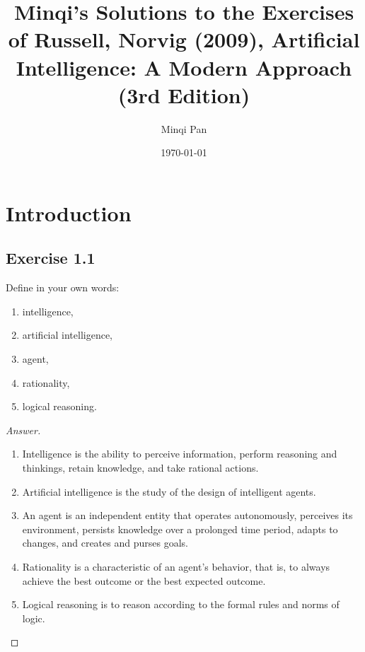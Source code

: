 \documentclass{amsbook}
\theoremstyle{definition}
\theoremstyle{remark}
\numberwithin{section}{chapter}
\numberwithin{equation}{chapter}
\begin{document}
\frontmatter

\title{Minqi's Solutions to the Exercises of Russell, Norvig (2009), Artificial Intelligence: A Modern Approach (3rd Edition)}

\author{Minqi Pan}

\date{\today}

\maketitle

\setcounter{page}{4}

\tableofcontents

\mainmatter

\chapter{Introduction}

\section{Exercise 1.1}
Define in your own words:
\begin{enumerate}[label=(\alph*)]
\item intelligence,
\item artificial intelligence,
\item agent,
\item rationality,
\item logical reasoning.
\end{enumerate}
\begin{proof}[Answer]
\begin{enumerate}[label=(\alph*)]
\item Intelligence is the ability to perceive information, perform reasoning and thinkings, retain knowledge, and take rational actions.
\item Artificial intelligence is the study of the design of intelligent agents.
\item An agent is an independent entity that operates autonomously, perceives its environment, persists knowledge over a prolonged time period, adapts to changes, and creates and purses goals.
\item Rationality is a characteristic of an agent's behavior, that is, to always achieve the best outcome or the best expected outcome.
\item Logical reasoning is to reason according to the formal rules and norms of logic.
\end{enumerate}
\end{proof}
\end{document}
